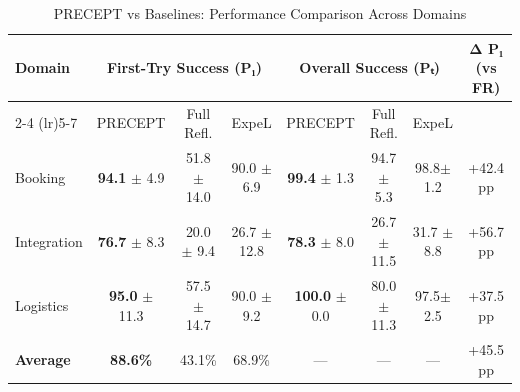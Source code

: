 \begin{table}[t]
\centering
\caption{PRECEPT vs Baselines: Performance Comparison Across Domains}
\label{tab:main_comparison}
\begin{tabular}{lccccccc}
\toprule
Domain & \multicolumn{3}{c}{First-Try Success (P₁)} & \multicolumn{3}{c}{Overall Success (Pₜ)} & Δ P₁ (vs FR) \\
\cmidrule(lr){2-4} \cmidrule(lr){5-7}
 & PRECEPT & Full Refl. & ExpeL & PRECEPT & Full Refl. & ExpeL & \\
\midrule
Booking & \textbf{94.1} $\pm$ 4.9 & 51.8 $\pm$ 14.0 & 90.0 $\pm$ 6.9 & \textbf{99.4} $\pm$ 1.3 & 94.7$\pm$ 5.3 & 98.8$\pm$ 1.2 & +42.4 pp \\
Integration & \textbf{76.7} $\pm$ 8.3 & 20.0 $\pm$ 9.4 & 26.7 $\pm$ 12.8 & \textbf{78.3} $\pm$ 8.0 & 26.7 $\pm$ 11.5 & 31.7 $\pm$ 8.8 & +56.7 pp \\
Logistics & \textbf{95.0} $\pm$ 11.3 & 57.5 $\pm$ 14.7 & 90.0 $\pm$ 9.2 & \textbf{100.0} $\pm$ 0.0 & 80.0 $\pm$ 11.3 & 97.5$\pm$ 2.5 & +37.5 pp \\
\midrule
\textbf{Average} & \textbf{88.6\%} & 43.1\% & 68.9\% & — & — & — & +45.5 pp \\
\bottomrule
\end{tabular}
\end{table}